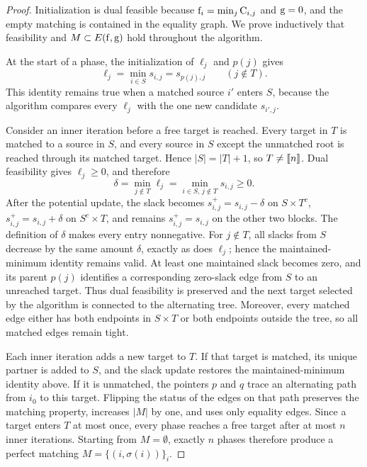 \begin{proof}
	Initialization is dual feasible because $\mathrm{f}_i=\min_j\mathrm{C}_{i,j}$ and $\mathrm{g}=0$, and the empty matching is contained in the equality graph. We prove inductively that feasibility and $M\subset E(\mathrm{f},\mathrm{g})$ hold throughout the algorithm.

	At the start of a phase, the initialization of $\ell_j$ and $p(j)$ gives
	\[
		\ell_j=\min_{i\in S}s_{i,j}=s_{p(j),j}
		\qquad (j\notin T).
	\]
	This identity remains true when a matched source $i'$ enters $S$, because the algorithm compares every $\ell_j$ with the one new candidate $s_{i',j}$.

	Consider an inner iteration before a free target is reached. Every target in $T$ is matched to a source in $S$, and every source in $S$ except the unmatched root is reached through its matched target. Hence $|S|=|T|+1$, so $T\neq\llbracket n\rrbracket$. Dual feasibility gives $\ell_j\geq0$, and therefore
	\[
		\delta=\min_{j\notin T}\ell_j
		=\min_{i\in S,\,j\notin T}s_{i,j}\geq0.
	\]
		After the potential update, the slack becomes
		$s_{i,j}^{+}=s_{i,j}-\delta$ on $S\times T^c$,
		$s_{i,j}^{+}=s_{i,j}+\delta$ on $S^c\times T$, and remains
		$s_{i,j}^{+}=s_{i,j}$ on the other two blocks.
	The definition of $\delta$ makes every entry nonnegative. For $j\notin T$, all slacks from $S$ decrease by the same amount $\delta$, exactly as does $\ell_j$; hence the maintained-minimum identity remains valid. At least one maintained slack becomes zero, and its parent $p(j)$ identifies a corresponding zero-slack edge from $S$ to an unreached target. Thus dual feasibility is preserved and the next target selected by the algorithm is connected to the alternating tree. Moreover, every matched edge either has both endpoints in $S\times T$ or both endpoints outside the tree, so all matched edges remain tight.

	Each inner iteration adds a new target to $T$. If that target is matched, its unique partner is added to $S$, and the slack update restores the maintained-minimum identity above. If it is unmatched, the pointers $p$ and $q$ trace an alternating path from $i_0$ to this target. Flipping the status of the edges on that path preserves the matching property, increases $|M|$ by one, and uses only equality edges. Since a target enters $T$ at most once, every phase reaches a free target after at most $n$ inner iterations. Starting from $M=\emptyset$, exactly $n$ phases therefore produce a perfect matching $M=\{(i,\sigma(i))\}_i$.


\end{proof}
